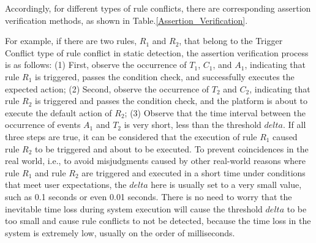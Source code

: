 Accordingly, for different types of rule conflicts, there are corresponding assertion verification methods, as shown in Table.\ref{Assertion_Verification}.

For example, if there are two rules, $R_1$ and $R_2$, that belong to the Trigger Conflict type of rule conflict in static detection, the assertion verification process is as follows: (1) First, observe the occurrence of $T_1$, $C_1$, and $A_1$, indicating that rule $R_1$ is triggered, passes the condition check, and successfully executes the expected action; (2) Second, observe the occurrence of $T_2$ and $C_2$, indicating that rule $R_2$ is triggered and passes the condition check, and the platform is about to execute the default action of $R_2$; (3) Observe that the time interval between the occurrence of events $A_1$ and $T_2$ is very short, less than the threshold $delta$. If all three steps are true, it can be considered that the execution of rule $R_1$ caused rule $R_2$ to be triggered and about to be executed. To prevent coincidences in the real world, i.e., to avoid misjudgments caused by other real-world reasons where rule $R_1$ and rule $R_2$ are triggered and executed in a short time under conditions that meet user expectations, the $delta$ here is usually set to a very small value, such as 0.1 seconds or even 0.01 seconds. There is no need to worry that the inevitable time loss during system execution will cause the threshold $delta$ to be too small and cause rule conflicts to not be detected, because the time loss in the system is extremely low, usually on the order of milliseconds.

